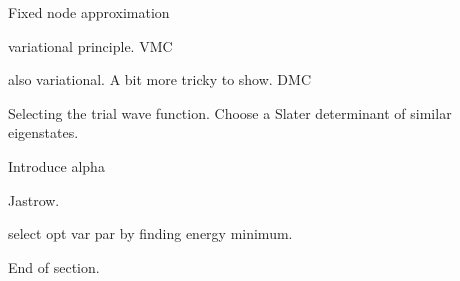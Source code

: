 

\begin{frame}
 Fixed node approximation
\end{frame}

\begin{frame}
 variational principle.
 VMC
\end{frame}

\begin{frame}
also variational. A bit more tricky to show.
 DMC
\end{frame}

\begin{frame}
 Selecting the trial wave function.
 Choose a Slater determinant of similar eigenstates.
\end{frame}

\begin{frame}
 Introduce alpha
\end{frame}


\begin{frame}
 Jastrow. 
\end{frame}

\begin{frame}
 select opt var par by finding energy minimum.
\end{frame}





















% 
% 
% 

 














\begin{frame}
 End of section.
\end{frame}
